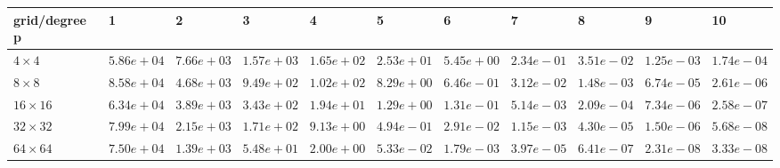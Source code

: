 \begin{tabular}{lllllllllll}
\hline
 grid/degree p   & 1          & 2          & 3          & 4          & 5          & 6          & 7          & 8          & 9          & 10         \\
\hline
 $4 \times 4$    & $5.86e+04$ & $7.66e+03$ & $1.57e+03$ & $1.65e+02$ & $2.53e+01$ & $5.45e+00$ & $2.34e-01$ & $3.51e-02$ & $1.25e-03$ & $1.74e-04$ \\
 $8 \times 8$    & $8.58e+04$ & $4.68e+03$ & $9.49e+02$ & $1.02e+02$ & $8.29e+00$ & $6.46e-01$ & $3.12e-02$ & $1.48e-03$ & $6.74e-05$ & $2.61e-06$ \\
 $16 \times 16$  & $6.34e+04$ & $3.89e+03$ & $3.43e+02$ & $1.94e+01$ & $1.29e+00$ & $1.31e-01$ & $5.14e-03$ & $2.09e-04$ & $7.34e-06$ & $2.58e-07$ \\
 $32 \times 32$  & $7.99e+04$ & $2.15e+03$ & $1.71e+02$ & $9.13e+00$ & $4.94e-01$ & $2.91e-02$ & $1.15e-03$ & $4.30e-05$ & $1.50e-06$ & $5.68e-08$ \\
 $64 \times 64$  & $7.50e+04$ & $1.39e+03$ & $5.48e+01$ & $2.00e+00$ & $5.33e-02$ & $1.79e-03$ & $3.97e-05$ & $6.41e-07$ & $2.31e-08$ & $3.33e-08$ \\
\hline
\end{tabular}
